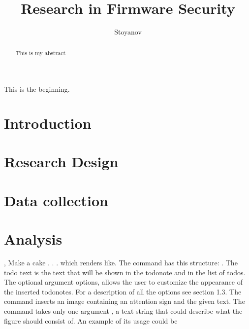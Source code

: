 \documentclass[]{report}
\title{Research in Firmware Security}
\author{Stoyanov}
\begin{document}
\maketitle

\begin{abstract}
	This is my abstract
\end{abstract}
This is the beginning.
\section{Introduction}
\section{Research Design}
\section{Data collection}
\section{Analysis}



,
Make a cake . . . which renders like. The \todo command has this structure: . The todo text is the text that will be shown in the todonote and in the
list of todos. The optional argument options, allows the user to customize the
appearance of the inserted todonotes. For a description of all the options see
section 1.3.
\missingfigure The \missingfigure command inserts an image containing an attention sign
and the given text. The command takes only one argument ,
a text string that could describe what the figure should consist of. An example of
its usage could be
\end{document}
